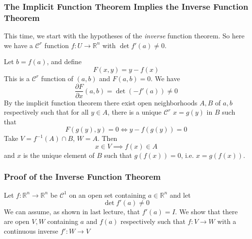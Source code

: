 \documentclass{article}
\newcommand{\reals}[0]{\mathbb{R}}
\newcommand{\mc}[1]{\mathcal{#1}}
\newcommand{\prt}[2]{\frac{\partial #1}{\partial #2}}
\begin{document}
\subsubsection{The Implicit Function Theorem Implies the Inverse Function Theorem}

This time, we start with the hypotheses of the \textit{inverse} function theorem. So here we have a \(\mc{C}^r\) function \(f: U \to \reals^n\) with \(\det f'(a) \neq 0\).

Let \(b = f(a)\), and define
\begin{equation}F(x, y) = y - f(x)\end{equation}
This is a \(\mc{C}^r\) function of \((a, b)\) and \(F(a, b) = 0\). We have
\begin{equation}\prt{F}{x}(a, b) = \det(-f'(a)) \neq 0\end{equation}
By the implicit function theorem there exist open neighborhoods \(A, B\) of \(a, b\) respectively such that for all \(y \in A\), there is a unique \(\mc{C}^r\) \(x = g(y)\) in \(B\) such that
\begin{equation}F(g(y), y) = 0 \iff y - f(g(y)) = 0\end{equation}
Take \(V = f^{-1}(A) \cap B\), \(W = A\). Then
\begin{equation}x \in V \implies f(x) \in A\end{equation}
and \(x\) is the unique element of \(B\) such that \(g(f(x)) = 0\), i.e. \(x = g(f(x))\).

\subsubsection{Proof of the Inverse Function Theorem}

Let \(f: \reals^n \to \reals^n\) be \(\mc{C}^1\) on an open set containing \(a \in \reals^n\) and let \begin{equation}\det f'(a) \neq 0\end{equation}
We can assume, as shown in last lecture, that \(f'(a) = I\).
We show that there are open \(V, W\) containing \(a\) and \(f(a)\) respectively such that \(f: V \to W\) with a continuous inverse \(f': W \to V\)
\end{document}

